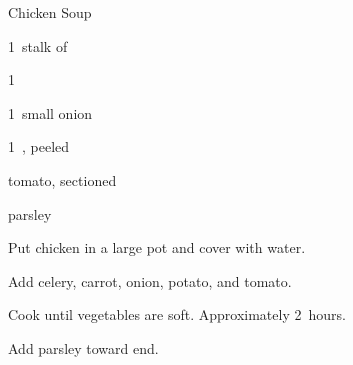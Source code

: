 \begin{recipe}{Chicken Soup}{}{}

\begin{ingredients}
\item {}
\item 1~stalk of 
\item 1~
\item 1~small onion
\item 1~, peeled
\item tomato, sectioned
\item parsley
\end{ingredients}

\begin{directions}
\item Put chicken in a large pot and cover with water.
\item Add celery, carrot, onion, potato, and tomato.
\item Cook until vegetables are soft. Approximately 2~hours.
\item Add parsley toward end.
\end{directions}

\end{recipe}
